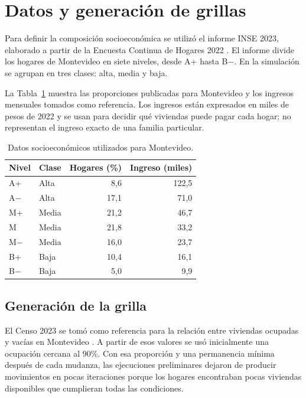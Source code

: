 \section{Datos y generación de grillas}

Para definir la composición socioeconómica se utilizó el informe INSE 2023, elaborado a partir de la Encuesta Continua de Hogares 2022 \cite{inse2023}. El informe divide los hogares de Montevideo en siete niveles, desde A+ hasta B$-$. En la simulación se agrupan en tres clases: alta, media y baja.

La Tabla~\ref{tab:datos-inse} muestra las proporciones publicadas para Montevideo y los ingresos mensuales tomados como referencia. Los ingresos están expresados en miles de pesos de 2022 y se usan para decidir qué viviendas puede pagar cada hogar; no representan el ingreso exacto de una familia particular.

\begin{table}[ht]
\centering
\caption{Datos socioeconómicos utilizados para Montevideo.}
\label{tab:datos-inse}
\begin{tabular}{l l r r}
\toprule
Nivel & Clase & Hogares (\%) & Ingreso (miles) \\
\midrule
A+    & Alta  & 8,6  & 122,5 \\
A$-$  & Alta  & 17,1 & 71,0  \\
M+    & Media & 21,2 & 46,7  \\
M     & Media & 21,8 & 33,2  \\
M$-$  & Media & 16,0 & 23,7  \\
B+    & Baja  & 10,4 & 16,1  \\
B$-$  & Baja  & 5,0  & 9,9   \\
\bottomrule
\end{tabular}
\end{table}

\subsection{Generación de la grilla}

El Censo 2023 se tomó como referencia para la relación entre viviendas ocupadas y vacías en Montevideo \cite{censo2023}. A partir de esos valores se usó inicialmente una ocupación cercana al 90\%. Con esa proporción y una permanencia mínima después de cada mudanza, las ejecuciones preliminares dejaron de producir movimientos en pocas iteraciones porque los hogares encontraban pocas viviendas disponibles que cumplieran todas las condiciones.

